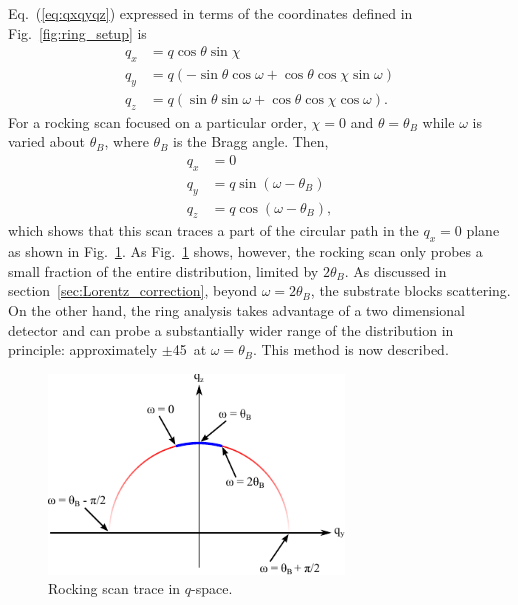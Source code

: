 Eq.~(\ref{eq:qxqyqz}) expressed in terms of the coordinates defined in 
Fig.~\ref{fig:ring_setup} is
\begin{align}
  q_x &= q\cos\theta\sin\chi \nonumber\\
  q_y &= q\left(-\sin\theta\cos\omega + \cos\theta\cos\chi\sin\omega\right) \nonumber\\
  q_z &= q\left(\sin\theta\sin\omega + \cos\theta\cos\chi\cos\omega\right).
  \label{eq:ccd2q}
\end{align}
For a rocking scan focused on a particular order, 
$\chi=0$ and $\theta=\theta_B$ while $\omega$ is varied about $\theta_B$, 
where $\theta_B$ is the Bragg angle. Then, 
\begin{align}
  q_x &= 0 \nonumber\\
  q_y &= q\sin(\omega-\theta_B) \nonumber\\
  q_z &= q\cos(\omega-\theta_B),
  \label{eq:rock} 
\end{align}
which shows that this scan traces a part of the circular path in the $q_x=0$ plane
as shown in Fig.~\ref{fig:rock}. As Fig.~\ref{fig:rock} shows, however, the 
rocking scan only probes a small fraction of the entire distribution, limited
by $2\theta_B$. As discussed in section~\ref{sec:Lorentz_correction}, beyond
$\omega=2\theta_B$, the substrate blocks scattering. On the other hand,
the ring analysis takes advantage of a two dimensional detector and can probe
a substantially wider range of the distribution in principle: approximately $\pm$45\textdegree\
at $\omega=\theta_B$. This method is now described.

\begin{figure}
  \centering
  \includegraphics[width=0.7\textwidth]{figures/ripple/mosaic/rock}
  \caption{Rocking scan trace in $q$-space.}
  \label{fig:rock}
\end{figure}

